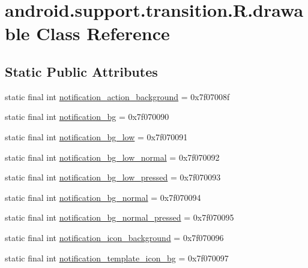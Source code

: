 \hypertarget{classandroid_1_1support_1_1transition_1_1R_1_1drawable}{}\section{android.\+support.\+transition.\+R.\+drawable Class Reference}
\label{classandroid_1_1support_1_1transition_1_1R_1_1drawable}
\subsection*{Static Public Attributes}
\begin{DoxyCompactItemize}
\item 
static final int \mbox{\hyperlink{classandroid_1_1support_1_1transition_1_1R_1_1drawable_aa63a282bba48259acff502a4c32c48dd}{notification\+\_\+action\+\_\+background}} = 0x7f07008f
\item 
static final int \mbox{\hyperlink{classandroid_1_1support_1_1transition_1_1R_1_1drawable_a4e2d76cf7e408949c2b4a0776c7d683e}{notification\+\_\+bg}} = 0x7f070090
\item 
static final int \mbox{\hyperlink{classandroid_1_1support_1_1transition_1_1R_1_1drawable_a80e92867febdd3ad8ce052e040508e3c}{notification\+\_\+bg\+\_\+low}} = 0x7f070091
\item 
static final int \mbox{\hyperlink{classandroid_1_1support_1_1transition_1_1R_1_1drawable_a9fa9887b0c07972b38d4759215a9514c}{notification\+\_\+bg\+\_\+low\+\_\+normal}} = 0x7f070092
\item 
static final int \mbox{\hyperlink{classandroid_1_1support_1_1transition_1_1R_1_1drawable_a5fe6e84c8b7aaf6841d0d37d1fba6dbb}{notification\+\_\+bg\+\_\+low\+\_\+pressed}} = 0x7f070093
\item 
static final int \mbox{\hyperlink{classandroid_1_1support_1_1transition_1_1R_1_1drawable_a5331c92aadadaaf082aadfe262fcfaf8}{notification\+\_\+bg\+\_\+normal}} = 0x7f070094
\item 
static final int \mbox{\hyperlink{classandroid_1_1support_1_1transition_1_1R_1_1drawable_a267ef5dc70197b1688c3a36f7d3a514d}{notification\+\_\+bg\+\_\+normal\+\_\+pressed}} = 0x7f070095
\item 
static final int \mbox{\hyperlink{classandroid_1_1support_1_1transition_1_1R_1_1drawable_ab61974a44b1c6b8eafba4027955dac77}{notification\+\_\+icon\+\_\+background}} = 0x7f070096
\item 
static final int \mbox{\hyperlink{classandroid_1_1support_1_1transition_1_1R_1_1drawable_a0a2b6625f2aae8b0f520911b4dfe0c42}{notification\+\_\+template\+\_\+icon\+\_\+bg}} = 0x7f070097

\end{DoxyCompactItemize}
